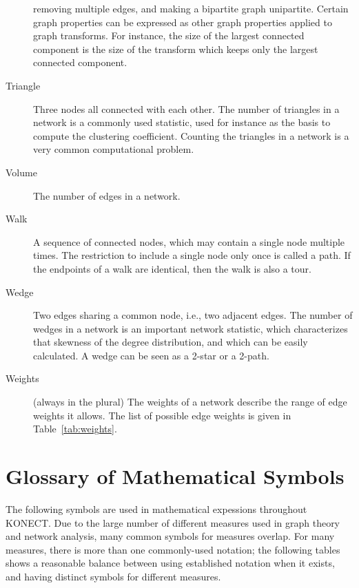 \documentclass{article}
\begin{document}
\begin{description}
    removing multiple edges, and making a bipartite graph unipartite.
    Certain graph properties can be expressed as other graph properties
    applied to graph transforms.  For instance, the size of the largest
    connected component is the size of the transform which keeps only
    the largest connected component. 
  \item[Triangle]
    Three nodes all connected with each other.  The number of triangles
    in a network is a commonly used statistic, used for instance as
    the basis to compute the clustering coefficient.  Counting the
    triangles in a network is a very common computational problem.  
  \item[Volume]
    The number of edges in a network.  
  \item[Walk]
    A sequence of connected nodes, which may contain a single node
    multiple times.  The restriction to include a single node only once
    is called a path.  If the endpoints of a walk are identical, then
    the walk is also a tour.  
  \item[Wedge] 
    Two edges sharing a common node, i.e., two adjacent edges.  The
    number of wedges in a network is an important network statistic,
    which characterizes that skewness of the degree distribution, and
    which can be easily calculated.  A wedge can be seen as a 2-star or
    a 2-path.  
  \item[Weights] (always in the plural)
    The weights of a network describe the range of edge weights it
    allows.  The list of possible edge weights is given in
    Table~\ref{tab:weights}.  
\end{description}

\section{Glossary of Mathematical Symbols}

The following symbols are used in mathematical expessions throughout
KONECT.  Due to the large number of different measures used in graph
theory and network analysis, many common symbols for measures overlap.
For many measures, there is more than one commonly-used notation; the
following tables shows a reasonable balance between using established
notation when it exists, and having distinct symbols for different
measures. \\
\end{document}
